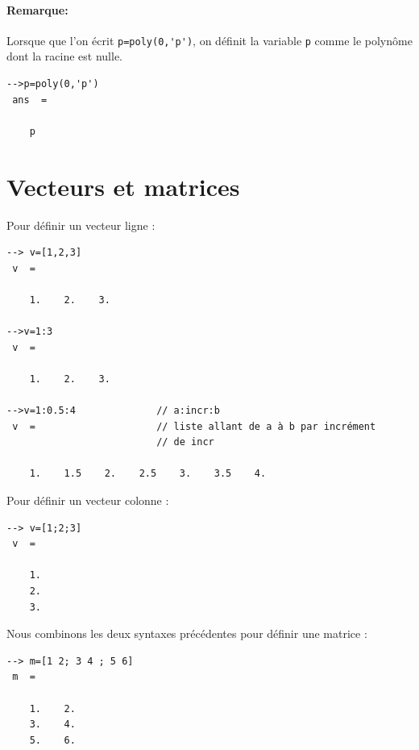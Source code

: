\paragraph{Remarque:}
Lorsque que l'on écrit \verb?p=poly(0,'p')?, on définit la variable \verb?p? comme le polynôme dont la racine est nulle.
\begin{code}                                                                                                                  
\begin{verbatim}
-->p=poly(0,'p')  
 ans  =
 
    p
\end{verbatim}                                                                                                                
\end{code}     


\section{Vecteurs et matrices}


Pour définir un vecteur ligne :
\begin{code}
\begin{verbatim}
--> v=[1,2,3]
 v  =
 
    1.    2.    3. 

-->v=1:3
 v  =
 
    1.    2.    3.

-->v=1:0.5:4              // a:incr:b
 v  =                     // liste allant de a à b par incrément 
                          // de incr
 
    1.    1.5    2.    2.5    3.    3.5    4.
\end{verbatim}
\end{code}

Pour définir un vecteur colonne :
\begin{code}
\begin{verbatim}
--> v=[1;2;3]
 v  =
 
    1.    
    2.
    3. 
\end{verbatim}
\end{code}

Nous combinons les deux syntaxes précédentes pour définir une matrice : 
\begin{code}
\begin{verbatim}
--> m=[1 2; 3 4 ; 5 6]
 m  =
 
    1.    2.  
    3.    4.  
    5.    6.  
\end{verbatim}
\end{code}

